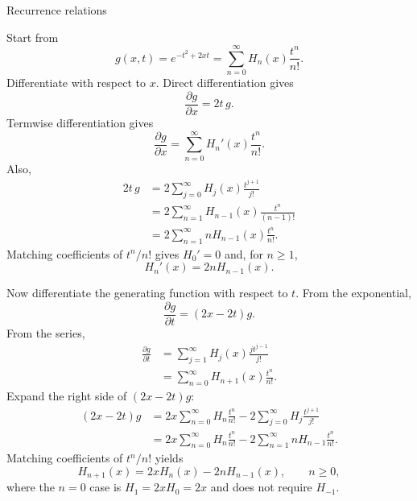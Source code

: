 \documentclass[11pt]{beamer}
\begin{document}
\begin{frame}[allowframebreaks]{Recurrence relations}
\footnotesize

Start from
\[
  g(x,t)=e^{-t^2+2xt}
  =\sum_{n=0}^{\infty}H_n(x)\frac{t^n}{n!}.
\]
Differentiate with respect to $x$. Direct differentiation gives
\[
  \frac{\partial g}{\partial x}=2t\,g.
\]
Termwise differentiation gives
\[
  \frac{\partial g}{\partial x}
  =\sum_{n=0}^{\infty}H_n'(x)\frac{t^n}{n!}.
\]
Also,
\begin{align*}
  2t\,g
  &=2\sum_{j=0}^{\infty}H_j(x)\frac{t^{j+1}}{j!}\\
  &=2\sum_{n=1}^{\infty}H_{n-1}(x)\frac{t^n}{(n-1)!}\\
  &=2\sum_{n=1}^{\infty}nH_{n-1}(x)\frac{t^n}{n!}.
\end{align*}
Matching coefficients of $t^n/n!$ gives $H_0'=0$ and, for $n\ge1$,
\begin{equation}
  H_n'(x)=2nH_{n-1}(x).
  \label{eq:hermite-deriv}
\end{equation}

Now differentiate the generating function with respect to $t$. From the exponential,
\[
  \frac{\partial g}{\partial t}=(2x-2t)g.
\]
From the series,
\begin{align*}
  \frac{\partial g}{\partial t}
  &=\sum_{j=1}^{\infty}H_j(x)\frac{j t^{j-1}}{j!}\\
  &=\sum_{n=0}^{\infty}H_{n+1}(x)\frac{t^n}{n!}.
\end{align*}
Expand the right side of $(2x-2t)g$:
\begin{align*}
  (2x-2t)g
  &=2x\sum_{n=0}^{\infty}H_n\frac{t^n}{n!}
    -2\sum_{j=0}^{\infty}H_j\frac{t^{j+1}}{j!}\\
  &=2x\sum_{n=0}^{\infty}H_n\frac{t^n}{n!}
    -2\sum_{n=1}^{\infty}nH_{n-1}\frac{t^n}{n!}.
\end{align*}
Matching coefficients of $t^n/n!$ yields
\begin{equation}
  H_{n+1}(x)=2xH_n(x)-2nH_{n-1}(x),
  \qquad n\ge0,
  \label{eq:hermite-recur}
\end{equation}
where the $n=0$ case is $H_1=2xH_0=2x$ and does not require $H_{-1}$.
\end{frame}
\end{document}
